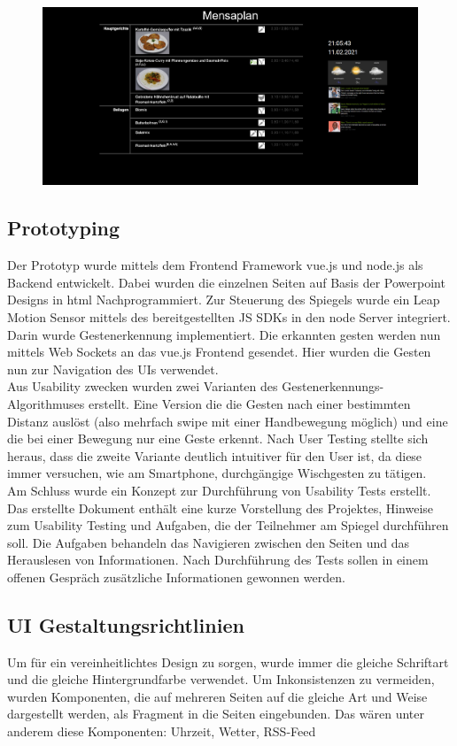\documentclass[12pt, a4paper]{scrartcl}
\begin{document}
	\begin{figure}[h!]
		\centering
		\includegraphics[width = 0.4\linewidth]{img/mensa.png}
	\end{figure}

	\subsection{Prototyping}
	Der Prototyp wurde mittels dem Frontend Framework vue.js und node.js als Backend entwickelt. Dabei wurden die einzelnen Seiten auf Basis der Powerpoint Designs in html Nachprogrammiert. Zur Steuerung des Spiegels wurde ein Leap Motion Sensor mittels des bereitgestellten JS SDKs in den node Server integriert. Darin wurde Gestenerkennung implementiert. Die erkannten gesten werden nun mittels Web Sockets an das vue.js Frontend gesendet. Hier wurden die Gesten nun zur Navigation des UIs verwendet.\\
	Aus Usability zwecken wurden zwei Varianten des Gestenerkennungs-Algorithmuses erstellt. Eine Version die die Gesten nach einer bestimmten Distanz auslöst (also mehrfach swipe mit einer Handbewegung möglich) und eine die bei einer Bewegung nur eine Geste erkennt. Nach User Testing stellte sich heraus, dass die zweite Variante deutlich intuitiver für den User ist, da diese immer versuchen, wie am Smartphone, durchgängige Wischgesten zu tätigen.\\
	Am Schluss wurde ein Konzept zur Durchführung von Usability Tests erstellt. Das erstellte Dokument enthält eine kurze Vorstellung des Projektes, Hinweise zum Usability Testing und Aufgaben, die der Teilnehmer am Spiegel durchführen soll. Die Aufgaben behandeln das Navigieren zwischen den Seiten und das Herauslesen von Informationen. Nach Durchführung des Tests sollen in einem offenen Gespräch zusätzliche Informationen gewonnen werden.
	
	
	\subsection{UI Gestaltungsrichtlinien}
	Um für ein vereinheitlichtes Design zu sorgen, wurde immer die gleiche Schriftart und die gleiche Hintergrundfarbe verwendet. Um Inkonsistenzen zu vermeiden, wurden Komponenten, die auf mehreren Seiten auf die gleiche Art und Weise dargestellt werden, als Fragment in die Seiten eingebunden. Das wären unter anderem diese Komponenten: Uhrzeit, Wetter, RSS-Feed
	
\end{document}
